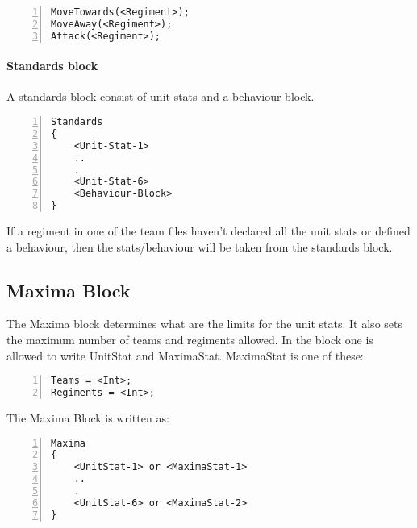 		\begin{lstlisting}[basicstyle=\small\sffamily,
		keywordstyle={\color{blue}},
		comment={[l]{//}}, morecomment={[s]{/*}{*/}}, commentstyle=\itshape,
		columns={[l]flexible}, numbers=left, numberstyle=\tiny,
		frameround=fftt, frame=shadowbox, captionpos=b,
		caption={Unit functions}]
MoveTowards(<Regiment>);
MoveAway(<Regiment>);
Attack(<Regiment>);
			\end{lstlisting}
	\paragraph{Standards block}
		A standards block consist of unit stats and a behaviour block. 

		\begin{lstlisting}[basicstyle=\small\sffamily,
		keywordstyle={\color{blue}},
		comment={[l]{//}}, morecomment={[s]{/*}{*/}}, commentstyle=\itshape,
		columns={[l]flexible}, numbers=left, numberstyle=\tiny,
		frameround=fftt, frame=shadowbox, captionpos=b,
		caption={Standards block}]
Standards
{
	<Unit-Stat-1>
	..
	.
	<Unit-Stat-6>
	<Behaviour-Block>
}
		\end{lstlisting}
		If a regiment in one of the team files haven't declared all the unit stats
		or defined a behaviour, then the stats/behaviour will be taken from the standards block.
	\subsection{Maxima Block}
		The Maxima block determines what are the limits for the unit stats. It also sets the maximum number of teams and regiments allowed.
		In the block one is allowed to write UnitStat and MaximaStat.
		MaximaStat is one of these:

		\begin{lstlisting}[basicstyle=\small\sffamily,
		keywordstyle={\color{blue}},
		comment={[l]{//}}, morecomment={[s]{/*}{*/}}, commentstyle=\itshape,
		columns={[l]flexible}, numbers=left, numberstyle=\tiny,
		frameround=fftt, frame=shadowbox, captionpos=b,
		caption={Maxima block}]
Teams = <Int>;
Regiments = <Int>;
		\end{lstlisting}
		The Maxima Block is written as:

		\begin{lstlisting}[basicstyle=\small\sffamily,
		keywordstyle={\color{blue}},
		comment={[l]{//}}, morecomment={[s]{/*}{*/}}, commentstyle=\itshape,
		columns={[l]flexible}, numbers=left, numberstyle=\tiny,
		frameround=fftt, frame=shadowbox, captionpos=b,
		caption={Maxima stat}]
Maxima
{
	<UnitStat-1> or <MaximaStat-1>
	..
	.
	<UnitStat-6> or <MaximaStat-2>
}
		\end{lstlisting}
